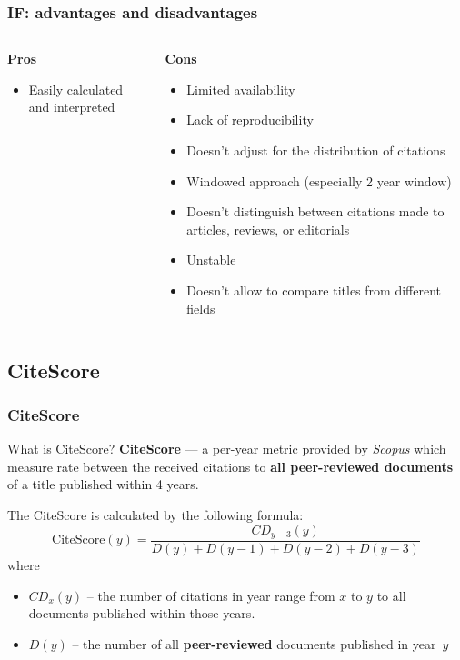 \documentclass{beamer}
\newcommand{\pros}{\item[{\textcolor[HTML]{3C8031}{\ding{51}}}]}
\newcommand{\cons}{\item[\textcolor{red}{\ding{54}}]}
\newcommand{\sco}{\textit{Scopus} }
\begin{document}
\begin{frame}
    \frametitle{IF: advantages and disadvantages}
    \begin{columns}[T]
        \begin{column}{.5\textwidth}
            \centering \textbf{Pros}
            \begin{itemize}[<+->]
                \pros Easily calculated and interpreted
            \end{itemize}
        \end{column}
        \begin{column}{.5\textwidth}
            \centering \textbf{Cons}
            \begin{itemize}[<+->]
                \cons Limited availability
                \cons Lack of reproducibility
                \cons Doesn’t adjust for the distribution of citations
                \cons Windowed approach (especially 2 year window)
                \cons Doesn’t distinguish between citations made to articles, reviews, or editorials
                \cons Unstable
                \cons Doesn't allow to compare titles from different fields
            \end{itemize}
        \end{column}
    \end{columns}
\end{frame}

\subsection{CiteScore}
\begin{frame}
    \frametitle{CiteScore}
    \begin{block}{What is CiteScore?}
        \textbf{CiteScore}\cite{CiteScore2016} --- a per-year metric provided
        by \sco which measure rate between the received citations
        to \textbf{all peer-reviewed documents} of a title published within 4 years.
    \end{block}

    The CiteScore is calculated by the following formula:
    \[
        \text{CiteScore}(y) = \frac{CD_{y-3}(y)}
        {D(y) + D(y-1) + D(y-2) + D(y-3)}
    \]
    where
    \begin{itemize}
        \item $CD_x(y)$ -- the number of citations in year range from $x$ to $y$
              to all documents published within those years.
        \item $D(y)$ -- the number of all \textbf{peer-reviewed} documents published in year~$y$
    \end{itemize}

\end{frame}
\end{document}
